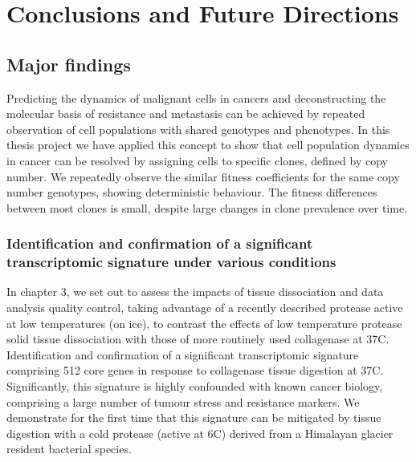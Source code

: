 
{\chapter{Conclusions and Future Directions}

}
\label{ch:Chapter6}

\section{Major findings}
Predicting the dynamics of malignant cells in cancers and deconstructing the molecular basis of resistance and metastasis can be achieved by repeated observation of cell populations with shared genotypes and phenotypes. In this thesis project we have applied this concept to show that cell population dynamics in cancer can be resolved by assigning cells to specific clones, defined by copy number. We repeatedly observe the similar fitness coefficients for the same copy number genotypes, showing deterministic behaviour. The fitness differences between most clones is small, despite large changes in clone prevalence over time.


\subsection{Identification and confirmation of a significant transcriptomic signature under various conditions}

In chapter 3, we set out to assess the impacts of tissue dissociation and data analysis quality control, taking advantage of a recently described protease active at low temperatures (on ice), to contrast the effects of low temperature protease solid tissue dissociation with those of more routinely used collagenase at 37\textdegree C. Identification and confirmation of a significant transcriptomic signature comprising 512 core genes in response to collagenase tissue digestion at 37\textdegree C. Significantly, this signature is highly confounded with known cancer biology, comprising a large number of tumour stress and resistance markers. We demonstrate for the first time that this signature can be mitigated by tissue digestion with a cold protease (active at 6\textdegree C) derived from a Himalayan glacier resident bacterial species.

